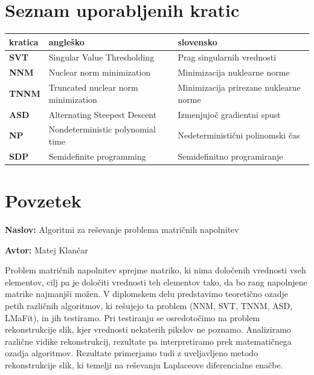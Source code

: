 \documentclass[a4paper,12pt,openright]{book}
\newcommand{\ttitle}{Algoritmi za reševanje problema matričnih napolnitev}
\newcommand{\tauthor}{Matej Klančar}
\newcommand{\clearemptydoublepage}{\newpage{\pagestyle{empty}\cleardoublepage}}
\begin{document}
\clearemptydoublepage


\chapter*{Seznam uporabljenih kratic}

\noindent\begin{tabular}{p{}|p{}|p{}}    %
    {\bf kratica} & {\bf angleško}                      & {\bf slovensko}                        \\ \hline
    {\bf SVT }    & Singular Value Thresholding         & Prag singularnih vrednosti             \\
    {\bf NNM}     & Nuclear norm minimization           & Minimizacija nuklearne norme           \\
    {\bf TNNM}    & Truncated nuclear norm minimization & Minimizacija prirezane nuklearne norme \\
    {\bf ASD}     & Alternating Steepest Descent        & Izmenjujoč gradientni spust            \\
    {\bf NP}     & Nondeterministic polynomial time       & Nedeterministični polinomski čas            \\
    {\bf SDP}     & Semidefinite programming        & Semidefinitno programiranje            
\end{tabular}


\clearemptydoublepage

{}
\chapter*{Povzetek}

\noindent\textbf{Naslov:} \ttitle
\bigskip

\noindent\textbf{Avtor:} \tauthor
\bigskip

\noindent Problem matričnih napolnitev sprejme matriko, ki nima določenih vrednosti vseh elementov, cilj pa je določiti vrednosti teh elementov tako, da bo rang napolnjene matrike najmanjši možen. V diplomskem delu predstavimo teoretično ozadje petih različnih algoritmov, ki rešujejo ta problem (NNM, SVT, TNNM, ASD, LMaFit), in jih testiramo. Pri testiranju se osredotočimo na problem rekonstrukcije slik, kjer vrednosti nekaterih pikslov ne poznamo. Analiziramo različne vidike rekonstrukcij, rezultate
pa interpretiramo prek matematičnega ozadja algoritmov. Rezultate primerjamo tudi z uveljavljeno metodo rekonstrukcije slik, ki temelji na reševanju Laplaceove diferencialne enačbe.
\end{document}
